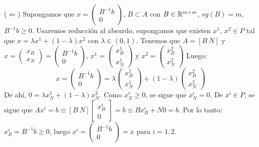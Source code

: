 \documentclass[PM.tex]{subfiles}
\begin{document}
\begin{dem}
($\Leftarrow$) Supongamos que $x =\begin{pmatrix} B^{-1}b\\0\end{pmatrix}$, $B \subset A$ con $B \in \mathbb{R}^{m \times m}$, $rg(B)=m$, $B^{-1}b ≥ 0$. Usaremos reducción al absurdo, supongamos que existen $x^1$, $x^2 \in P$ tal que $x = λx^1+(1-λ)x^2$ con $λ \in (0,1)$. Tenemos que $A = [B\ N]$ y $x = \begin{pmatrix}x_B\\x_N\end{pmatrix} = \begin{pmatrix} B^{-1}b\\0\end{pmatrix}$, $x^1 = \begin{pmatrix}x_B^1\\x_N^1\end{pmatrix}$ y $x^2 = \begin{pmatrix}x_B^2\\x_N^2\end{pmatrix}$ Luego:
\[ x = \begin{pmatrix} B^{-1}b\\0\end{pmatrix} = λ\begin{pmatrix}x_B^1\\x_N^1\end{pmatrix}+(1-λ)\begin{pmatrix}x_B^2\\x_N^2\end{pmatrix} \]
De ahí, $0 = λ x_N^1 + (1-λ) x_N^2$. Como $x_N^i ≥ 0$, se sigue que $x_N^i = 0$. De $x^i \in P$, se sigue que $Ax^i = b \equiv [B\ N]\begin{bmatrix}x_B^i\\0
\end{bmatrix} = b \equiv Bx_B^i + N0 = b$. Por lo tanto: $x_B^i = B^{-1}b \geq 0$, luego $x^i = \begin{pmatrix}B^{-1}b\\0\end{pmatrix}=x$ para $i=1,2$.


\end{dem}
\end{document}
